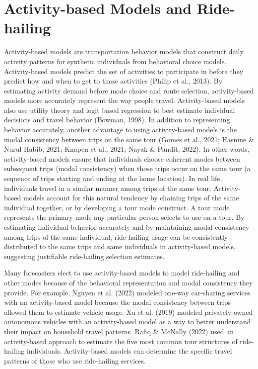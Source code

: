 \documentclass[fancy, masters]{byuthesis}
\begin{document}
\hypertarget{lit-abm}{%
\section{Activity-based Models and Ride-hailing}\label{lit-abm}}

Activity-based models are transportation behavior models that construct daily activity patterns for synthetic individuals from behavioral choice models. Activity-based models predict the set of activities to participate in before they predict how and when to get to those activities (Philip et al., 2013). By estimating activity demand before mode choice and route selection, activity-based models more accurately represent the way people travel. Activity-based models also use utility theory and logit based regression to best estimate individual decisions and travel behavior (Bowman, 1998). In addition to representing behavior accurately, another advantage to using activity-based models is the modal consistency between trips on the same tour (Gomes et al., 2021; Hasnine \& Nurul Habib, 2021; Knapen et al., 2021; Nayak \& Pandit, 2022). In other words, activity-based models ensure that individuals choose coherent modes between subsequent trips (modal consistency) when those trips occur on the same tour (a sequence of trips starting and ending at the home location). In real life, individuals travel in a similar manner among trips of the same tour. Activity-based models account for this natural tendency by chaining trips of the same individual together, or by developing a tour mode construct. A tour mode represents the primary mode any particular person selects to use on a tour. By estimating individual behavior accurately and by maintaining modal consistency among trips of the same individual, ride-hailing usage can be consistently distributed to the same trips and same individuals in activity-based models, suggesting justifiable ride-hailing selection estimates.

Many forecasters elect to use activity-based models to model ride-hailing and other modes because of the behavioral representation and modal consistency they provide. For example, Nguyen et al. (2022) modeled one-way car-sharing services with an activity-based model because the modal consistency between trips allowed them to estimate vehicle usage. Xu et al. (2019) modeled privately-owned autonomous vehicles with an activity-based model as a way to better understand their impact on household travel patterns. Rafiq \& McNally (2022) used an activity-based approach to estimate the five most common tour structures of ride-hailing individuals. Activity-based models can determine the specific travel patterns of those who use ride-hailing services.
\end{document}
